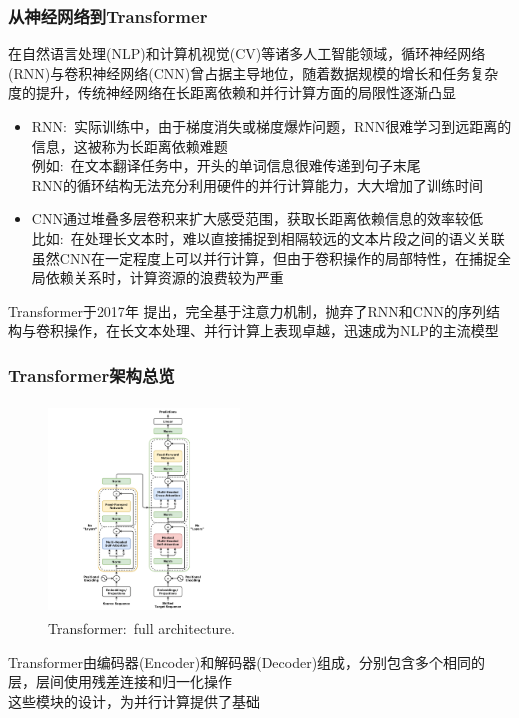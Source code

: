 \begin{frame}
	\frametitle{从神经网络到\textrm{Transformer}}
    在自然语言处理\textrm{(NLP)}和计算机视觉\textrm{(CV)}等诸多人工智能领域，循环神经网络\textrm{(RNN)}与卷积神经网络\textrm{(CNN)}曾占据主导地位，随着数据规模的增长和任务复杂度的提升，传统神经网络在长距离依赖和并行计算方面的局限性逐渐凸显
    \begin{itemize}
	    \item \textrm{RNN}:~实际训练中，由于梯度消失或梯度爆炸问题，RNN很难学习到远距离的信息，这被称为长距离依赖难题\\
		    例如:~在文本翻译任务中，开头的单词信息很难传递到句子末尾\\
		    \textrm{RNN}的循环结构无法充分利用硬件的并行计算能力，大大增加了训练时间
	    \item \textrm{CNN}通过堆叠多层卷积来扩大感受范围，获取长距离依赖信息的效率较低\\
		    比如:~在处理长文本时，难以直接捕捉到相隔较远的文本片段之间的语义关联\\
		    虽然\textrm{CNN}在一定程度上可以并行计算，但由于卷积操作的局部特性，在捕捉全局依赖关系时，计算资源的浪费较为严重
    \end{itemize}
    Transformer于\textrm{2017}年%
    提出，完全基于注意力机制，抛弃了\textrm{RNN}和\textrm{CNN}的序列结构与卷积操作，在长文本处理、并行计算上表现卓越，迅速成为\textrm{NLP}的主流模型
\end{frame}


\begin{frame}
	\frametitle{\textrm{Transformer}架构总览}
\begin{figure}[h!]
\centering
\includegraphics[height=2.2in, width=2.0in, viewport=300 0 1200 1500,clip]{Figures/Transformer_full_architecture.png}
\caption{\tiny \textrm{Transformer:~full architecture.}}%
\label{Transformer_full_architecture}
\end{figure}
    \textrm{Transformer}由编码器\textrm{(Encoder)}和解码器\textrm{(Decoder)}组成，分别包含多个相同的层，层间使用残差连接和归一化操作\\
    这些模块的设计，为并行计算提供了基础
\end{frame}


